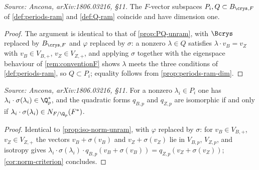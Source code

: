 \begin{proposition}[\(P_i = Q\), ramified case]
  \label{prop:PQ-ram}
  \textit{Source: Ancona, arXiv:1806.03216, \S11.}
  The \(F\)-vector subspaces \(P_i, Q \subset B_{\crys,F}\) of
  \cref{def:periods-ram} and \cref{def:Q-ram} coincide and have dimension one.
\end{proposition}

\begin{proof}
  The argument is identical to that of \cref{prop:PQ-unram}, with \(\Bcrys\)
  replaced by \(B_{\crys,F}\) and \(\varphi\) replaced by \(\sigma\): a nonzero
  \(\lambda \in Q\) satisfies \(\lambda \cdot v_B = v_Z\) with \(v_B \in V_{B,+}\),
  \(v_Z \in V_{Z,+}\), and applying \(\sigma\) together with the eigenspace
  behaviour of \cref{rem:conventionF} shows \(\lambda\) meets the three
  conditions of \cref{def:periods-ram}, so \(Q \subset P_i\); equality follows
  from \cref{prop:periods-ram-dim}.
\end{proof}

\begin{proposition}
  \label{prop:iso-norm-ram}
  \textit{Source: Ancona, arXiv:1806.03216, \S11.}
  For a nonzero \(\lambda_i \in P_i\) one has
  \(\lambda_i \cdot \sigma(\lambda_i) \in \Q_p^*\), and the quadratic forms
  \(q_{B,p}\) and \(q_{Z,p}\) are isomorphic if and only if
  \(\lambda_i \cdot \sigma(\lambda_i) \in N_{F/\Q_p}(F^*)\).
\end{proposition}

\begin{proof}
  Identical to \cref{prop:iso-norm-unram}, with \(\varphi\) replaced by
  \(\sigma\): for \(v_B \in V_{B,+}\), \(v_Z \in V_{Z,+}\) the vectors
  \(v_B + \sigma(v_B)\) and \(v_Z + \sigma(v_Z)\) lie in \(V_{B,p}\), \(V_{Z,p}\),
  and isotropy gives
  \(\lambda_i \cdot \sigma(\lambda_i) \cdot q_{B,p}(v_B + \sigma(v_B)) =
  q_{Z,p}(v_Z + \sigma(v_Z))\); \cref{cor:norm-criterion} concludes.
\end{proof}

